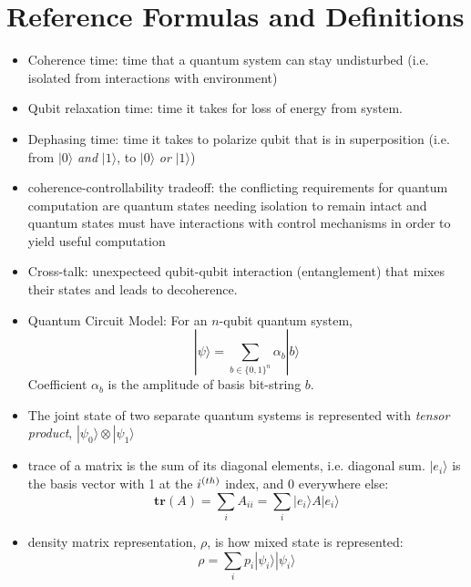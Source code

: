 \documentclass [12pt]{article}
\begin{document}
    \section{Reference Formulas and Definitions} %
        \begin{itemize}
            \item Coherence time: time that a quantum system can stay undisturbed (i.e. isolated from interactions with environment)
            
            \item Qubit relaxation time: time it takes for loss of energy from system. 
            
            \item Dephasing time: time it takes to polarize qubit that is in superposition (i.e. from $| 0 \rangle$ \emph{and} $| 1 \rangle$, to $| 0 \rangle$ \emph{or} $| 1 \rangle$)
            
            \item coherence-controllability tradeoff: the conflicting requirements for quantum computation are quantum states needing isolation to remain intact and quantum states must have interactions with control mechanisms in order to yield useful computation \cite{resch21}
            
            \item Cross-talk: unexpecteed qubit-qubit interaction (entanglement) that mixes their states and leads to decoherence. 
            
            \item Quantum Circuit Model: For an $n$-qubit quantum system,
            $$ | \psi \rangle = \sum_{b\in\{0,1\}^n} \alpha_b | b \rangle $$
            Coefficient $\alpha_b$ is the amplitude of basis bit-string $b$. 

            \item The joint state of two separate quantum systems is represented with \emph{tensor product}, $| \psi_0 \rangle \otimes | \psi_1 \rangle$
            
            \item trace of a matrix is the sum of its diagonal elements, i.e. diagonal sum. $|e_i\rangle$  is the basis vector with 1 at the $i^{\text(th)}$ index, and 0 everywhere else: $$ \textbf{tr}(A) = \sum_i A_{ii} = \sum_i | e_i \rangle A | e_i \rangle  $$
            
            \item density matrix representation, $\rho$, is how mixed state is represented: $$ \rho = \sum_i p_i | \psi_i \rangle | \psi_i \rangle $$
            

\end{itemize}
\end{document}
